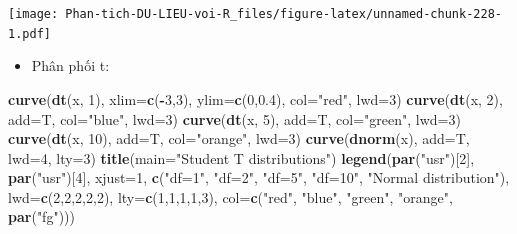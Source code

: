 \documentclass[
]{book}
\newenvironment{Shaded}{\begin{snugshade}}{\end{snugshade}}
\newcommand{\DataTypeTok}[1]{\textcolor[rgb]{0.13,0.29,0.53}{#1}}
\newcommand{\DecValTok}[1]{\textcolor[rgb]{0.00,0.00,0.81}{#1}}
\newcommand{\FloatTok}[1]{\textcolor[rgb]{0.00,0.00,0.81}{#1}}
\newcommand{\KeywordTok}[1]{\textcolor[rgb]{0.13,0.29,0.53}{\textbf{#1}}}
\newcommand{\NormalTok}[1]{#1}
\newcommand{\OperatorTok}[1]{\textcolor[rgb]{0.81,0.36,0.00}{\textbf{#1}}}
\newcommand{\StringTok}[1]{\textcolor[rgb]{0.31,0.60,0.02}{#1}}
\providecommand{\tightlist}{%
  \setlength{\itemsep}{0pt}\setlength{\parskip}{0pt}}
\begin{document}
\texttt{[image: Phan-tich-DU-LIEU-voi-R\_files/figure-latex/unnamed-chunk-228-1.pdf]}

\begin{itemize}
\tightlist
\item
  Phân phối t:
\end{itemize}

\begin{Shaded}
\begin{Highlighting}[]
\KeywordTok{curve}\NormalTok{(}\KeywordTok{dt}\NormalTok{(x, }\DecValTok{1}\NormalTok{), }\DataTypeTok{xlim=}\KeywordTok{c}\NormalTok{(}\OperatorTok{{-}}\DecValTok{3}\NormalTok{,}\DecValTok{3}\NormalTok{), }\DataTypeTok{ylim=}\KeywordTok{c}\NormalTok{(}\DecValTok{0}\NormalTok{,}\FloatTok{0.4}\NormalTok{), }\DataTypeTok{col=}\StringTok{"red"}\NormalTok{, }\DataTypeTok{lwd=}\DecValTok{3}\NormalTok{)}
\KeywordTok{curve}\NormalTok{(}\KeywordTok{dt}\NormalTok{(x, }\DecValTok{2}\NormalTok{), }\DataTypeTok{add=}\NormalTok{T, }\DataTypeTok{col=}\StringTok{"blue"}\NormalTok{, }\DataTypeTok{lwd=}\DecValTok{3}\NormalTok{)}
\KeywordTok{curve}\NormalTok{(}\KeywordTok{dt}\NormalTok{(x, }\DecValTok{5}\NormalTok{), }\DataTypeTok{add=}\NormalTok{T, }\DataTypeTok{col=}\StringTok{"green"}\NormalTok{, }\DataTypeTok{lwd=}\DecValTok{3}\NormalTok{)}
\KeywordTok{curve}\NormalTok{(}\KeywordTok{dt}\NormalTok{(x, }\DecValTok{10}\NormalTok{), }\DataTypeTok{add=}\NormalTok{T, }\DataTypeTok{col=}\StringTok{"orange"}\NormalTok{, }\DataTypeTok{lwd=}\DecValTok{3}\NormalTok{)}
\KeywordTok{curve}\NormalTok{(}\KeywordTok{dnorm}\NormalTok{(x), }\DataTypeTok{add=}\NormalTok{T, }\DataTypeTok{lwd=}\DecValTok{4}\NormalTok{, }\DataTypeTok{lty=}\DecValTok{3}\NormalTok{)}
\KeywordTok{title}\NormalTok{(}\DataTypeTok{main=}\StringTok{"Student T distributions"}\NormalTok{)}
\KeywordTok{legend}\NormalTok{(}\KeywordTok{par}\NormalTok{(}\StringTok{"usr"}\NormalTok{)[}\DecValTok{2}\NormalTok{], }\KeywordTok{par}\NormalTok{(}\StringTok{"usr"}\NormalTok{)[}\DecValTok{4}\NormalTok{], }
         \DataTypeTok{xjust=}\DecValTok{1}\NormalTok{, }
         \KeywordTok{c}\NormalTok{(}\StringTok{"df=1"}\NormalTok{, }\StringTok{"df=2"}\NormalTok{, }\StringTok{"df=5"}\NormalTok{, }
           \StringTok{"df=10"}\NormalTok{, }\StringTok{"Normal distribution"}\NormalTok{), }
         \DataTypeTok{lwd=}\KeywordTok{c}\NormalTok{(}\DecValTok{2}\NormalTok{,}\DecValTok{2}\NormalTok{,}\DecValTok{2}\NormalTok{,}\DecValTok{2}\NormalTok{,}\DecValTok{2}\NormalTok{), }
         \DataTypeTok{lty=}\KeywordTok{c}\NormalTok{(}\DecValTok{1}\NormalTok{,}\DecValTok{1}\NormalTok{,}\DecValTok{1}\NormalTok{,}\DecValTok{1}\NormalTok{,}\DecValTok{3}\NormalTok{), }
         \DataTypeTok{col=}\KeywordTok{c}\NormalTok{(}\StringTok{"red"}\NormalTok{, }\StringTok{"blue"}\NormalTok{, }\StringTok{"green"}\NormalTok{, }
               \StringTok{"orange"}\NormalTok{, }\KeywordTok{par}\NormalTok{(}\StringTok{"fg"}\NormalTok{))) }
\end{Highlighting}
\end{Shaded}
\end{document}

